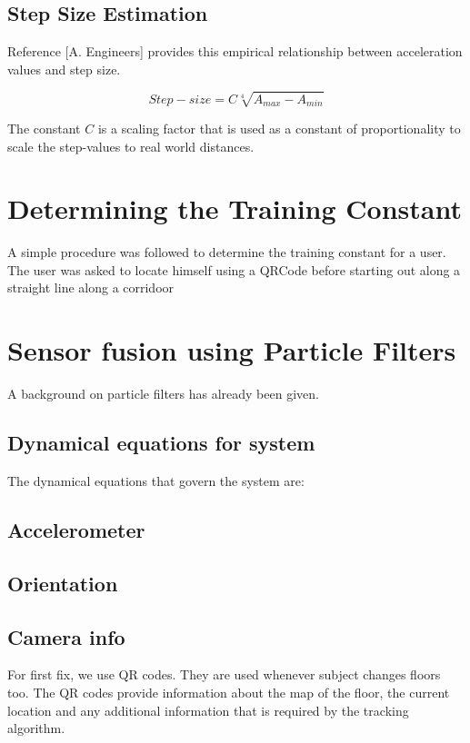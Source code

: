 \subsection{Step Size Estimation}

Reference [A. Engineers] provides this empirical relationship between acceleration
values and step size.

\begin{equation}
 Step-size = C \sqrt[4]{A_{max} - A_{min}}
\end{equation}

The constant $C$ is a scaling factor that is used as a constant of proportionality
to scale the step-values to real world distances.

\section{Determining the Training Constant}
A simple procedure was followed to determine the training constant for a user.
The user was asked to locate himself using a QRCode before starting out along
a straight line along a corridoor

\section{Sensor fusion using Particle Filters}

A background on particle filters has already been given.

\subsection{Dynamical equations for system}

The dynamical equations that govern the system are:



\subsection{Accelerometer}


\subsection{Orientation}

\subsection{Camera info}
For first fix, we use QR codes. They are used whenever subject changes floors too.
The QR codes provide information about the map of the floor, the current location
and any additional information that is required by the tracking algorithm.

